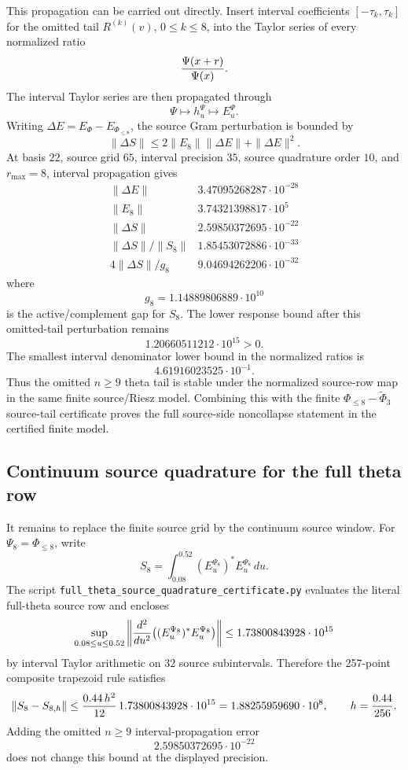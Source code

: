 \documentclass[11pt]{article}
\begin{document}
This propagation can be carried out directly.  Insert interval coefficients
\([-\tau_k,\tau_k]\) for the omitted tail \(R^{(k)}(v)\), \(0\le k\le8\), into
the Taylor series of every normalized ratio
\[
  {\Psi(x+r)\over\Psi(x)}.
\]
The interval Taylor series are then propagated through
\[
  \Psi\mapsto h_u^\Psi\mapsto E_u^\Psi.
\]
Writing \(\Delta E=E_\Phi-E_{\Phi_{\le8}}\), the source Gram perturbation is
bounded by
\[
  \|\Delta S\|
  \le
  2\|E_8\|\|\Delta E\|+\|\Delta E\|^2.
\]
At basis \(22\), source grid \(65\), interval precision \(35\), source
quadrature order \(10\), and \(r_{\max}=8\), interval propagation gives
\[
\begin{array}{c|c}
\|\Delta E\|&3.47095268287\cdot10^{-28}\\
\|E_8\|&3.74321398817\cdot10^5\\
\|\Delta S\|&2.59850372695\cdot10^{-22}\\
\|\Delta S\|/\|S_8\|&1.85453072886\cdot10^{-33}\\
4\|\Delta S\|/g_8&9.04694262206\cdot10^{-32}
\end{array}
\]
where
\[
  g_8=1.14889806889\cdot10^{10}
\]
is the active/complement gap for \(S_8\).  The lower response bound after this
omitted-tail perturbation remains
\[
  1.20660511212\cdot10^{15}>0.
\]
The smallest interval denominator lower bound in the normalized ratios is
\[
  4.61916023525\cdot10^{-1}.
\]
Thus the omitted \(n\ge9\) theta tail is stable under the normalized source-row
map in the same finite source/Riesz model.  Combining this with the finite
\(\Phi_{\le8}-\widetilde\Phi_3\) source-tail certificate proves the full
source-side noncollapse statement in the certified finite model.

\subsection{Continuum source quadrature for the full theta row}

It remains to replace the finite source grid by the continuum source window.
For \(\Psi_8=\Phi_{\le8}\), write
\[
  S_8=\int_{0.08}^{0.52} (E_u^{\Psi_8})^*E_u^{\Psi_8}\,du.
\]
The script \texttt{full\_theta\_source\_quadrature\_certificate.py} evaluates
the literal full-theta source row and encloses
\[
  \sup_{0.08\le u\le0.52}
  \left\|{d^2\over du^2}\big((E_u^{\Psi_8})^*E_u^{\Psi_8}\big)\right\|
  \le 1.73800843928\cdot10^{15}
\]
by interval Taylor arithmetic on 32 source subintervals.  Therefore the
257-point composite trapezoid rule satisfies
\[
  \|S_8-S_{8,h}\|
  \le {0.44\,h^2\over12}\,1.73800843928\cdot10^{15}
  =1.88255959690\cdot10^8,
  \qquad h={0.44\over256}.
\]
Adding the omitted \(n\ge9\) interval-propagation error
\[
  2.59850372695\cdot10^{-22}
\]
does not change this bound at the displayed precision.
\end{document}
